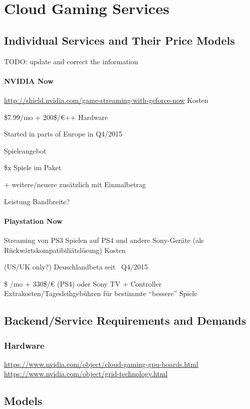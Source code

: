 \section{Cloud Gaming Services}

\subsection{Individual Services and Their Price Models}
TODO: update and correct the information


\paragraph{NVIDIA Now}
\url{http://shield.nvidia.com/game-streaming-with-geforce-now}
Kosten

\$7.99/mo + 200\$/€++ Hardware

Started in parts of Europe in Q4/2015

Spieleangebot

\$x Spiele im Paket

 + weitere/neuere zusätzlich mit Einmalbetrag

Leistung
Bandbreite? 

\paragraph{Playstation Now}
Streaming von PS3 Spielen auf PS4 und andere Sony-Geräte (als Rückwärtskompatibiliätslösung)
Kosten

(US/UK only?) Deuschlandbeta seit ~Q4/2015

\$ /mo + 330\$/€ (PS4) oder Sony TV + Controller
Extrakosten/Tagesleihgebühren für bestimmte ``bessere'' Spiele


\subsection{Backend/Service Requirements and Demands}

\subsubsection{Hardware}

\url{https://www.nvidia.com/object/cloud-gaming-gpu-boards.html}
\url{https://www.nvidia.com/object/grid-technology.html}


\subsection{Models}

